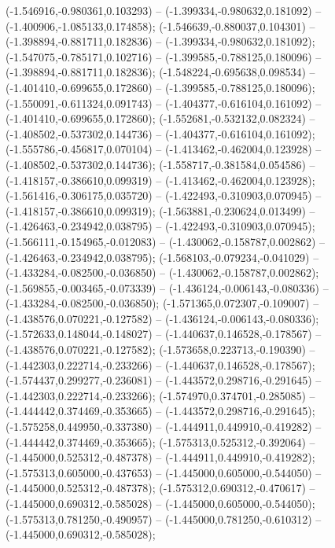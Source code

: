  (-1.546916,-0.980361,0.103293) -- (-1.399334,-0.980632,0.181092) -- (-1.400906,-1.085133,0.174858);
 (-1.546639,-0.880037,0.104301) -- (-1.398894,-0.881711,0.182836) -- (-1.399334,-0.980632,0.181092);
 (-1.547075,-0.785171,0.102716) -- (-1.399585,-0.788125,0.180096) -- (-1.398894,-0.881711,0.182836);
 (-1.548224,-0.695638,0.098534) -- (-1.401410,-0.699655,0.172860) -- (-1.399585,-0.788125,0.180096);
 (-1.550091,-0.611324,0.091743) -- (-1.404377,-0.616104,0.161092) -- (-1.401410,-0.699655,0.172860);
 (-1.552681,-0.532132,0.082324) -- (-1.408502,-0.537302,0.144736) -- (-1.404377,-0.616104,0.161092);
 (-1.555786,-0.456817,0.070104) -- (-1.413462,-0.462004,0.123928) -- (-1.408502,-0.537302,0.144736);
 (-1.558717,-0.381584,0.054586) -- (-1.418157,-0.386610,0.099319) -- (-1.413462,-0.462004,0.123928);
 (-1.561416,-0.306175,0.035720) -- (-1.422493,-0.310903,0.070945) -- (-1.418157,-0.386610,0.099319);
 (-1.563881,-0.230624,0.013499) -- (-1.426463,-0.234942,0.038795) -- (-1.422493,-0.310903,0.070945);
 (-1.566111,-0.154965,-0.012083) -- (-1.430062,-0.158787,0.002862) -- (-1.426463,-0.234942,0.038795);
 (-1.568103,-0.079234,-0.041029) -- (-1.433284,-0.082500,-0.036850) -- (-1.430062,-0.158787,0.002862);
 (-1.569855,-0.003465,-0.073339) -- (-1.436124,-0.006143,-0.080336) -- (-1.433284,-0.082500,-0.036850);
 (-1.571365,0.072307,-0.109007) -- (-1.438576,0.070221,-0.127582) -- (-1.436124,-0.006143,-0.080336);
 (-1.572633,0.148044,-0.148027) -- (-1.440637,0.146528,-0.178567) -- (-1.438576,0.070221,-0.127582);
 (-1.573658,0.223713,-0.190390) -- (-1.442303,0.222714,-0.233266) -- (-1.440637,0.146528,-0.178567);
 (-1.574437,0.299277,-0.236081) -- (-1.443572,0.298716,-0.291645) -- (-1.442303,0.222714,-0.233266);
 (-1.574970,0.374701,-0.285085) -- (-1.444442,0.374469,-0.353665) -- (-1.443572,0.298716,-0.291645);
 (-1.575258,0.449950,-0.337380) -- (-1.444911,0.449910,-0.419282) -- (-1.444442,0.374469,-0.353665);
 (-1.575313,0.525312,-0.392064) -- (-1.445000,0.525312,-0.487378) -- (-1.444911,0.449910,-0.419282);
 (-1.575313,0.605000,-0.437653) -- (-1.445000,0.605000,-0.544050) -- (-1.445000,0.525312,-0.487378);
 (-1.575312,0.690312,-0.470617) -- (-1.445000,0.690312,-0.585028) -- (-1.445000,0.605000,-0.544050);
 (-1.575313,0.781250,-0.490957) -- (-1.445000,0.781250,-0.610312) -- (-1.445000,0.690312,-0.585028);
